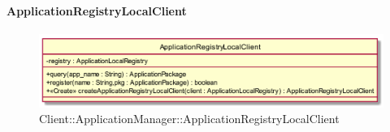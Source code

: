 \hypertarget{ApplicationRegistryLocalClient_label}{\paragraph{ApplicationRegistryLocalClient}}
\begin{figure}[h]
	\centering
	\includegraphics[width=\textwidth,height=\textheight,keepaspectratio]{images/ClassApplicationRegistryLocalClient.png}
	\caption{Client::ApplicationManager::ApplicationRegistryLocalClient}
\end{figure}

